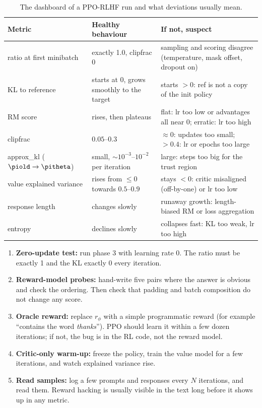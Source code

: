 \begin{table}[ht]
\centering\small
\begin{tabularx}{\linewidth}{@{}lXX@{}}
\toprule
\textbf{Metric} & \textbf{Healthy behaviour} & \textbf{If not, suspect}\\
\midrule
ratio at first minibatch & exactly 1.0, clipfrac 0 & sampling and scoring disagree (temperature, mask offset, dropout on)\\
KL to reference & starts at 0, grows smoothly to the target & starts $>0$: ref is not a copy of the init policy\\
RM score & rises, then plateaus & flat: lr too low or advantages all near 0; erratic: lr too high\\
clipfrac & $0.05$--$0.3$ & $\approx 0$: updates too small; $>0.4$: lr or epochs too large\\
approx\_kl ($\piold\to\pitheta$) & small, $\sim10^{-3}$--$10^{-2}$ per iteration & large: steps too big for the trust region\\
value explained variance & rises from $\le0$ towards $0.5$--$0.9$ & stays $<0$: critic misaligned (off-by-one) or lr too low\\
response length & changes slowly & runaway growth: length-biased RM or loss aggregation\\
entropy & declines slowly & collapses fast: KL too weak, lr too high\\
\bottomrule
\end{tabularx}
\caption{The dashboard of a PPO-RLHF run and what deviations usually mean.}
\label{tab:rlhf:dashboard}
\end{table}

\begin{deepdive}
\begin{enumerate}
  \item \textbf{Zero-update test:} run phase 3 with learning rate 0. The ratio must be exactly 1 and the KL
        exactly 0 every iteration.
  \item \textbf{Reward-model probes:} hand-write five pairs where the answer is obvious and check the
        ordering. Then check that padding and batch composition do not change any score.
  \item \textbf{Oracle reward:} replace $r_\phi$ with a simple programmatic reward (for example ``contains
        the word \emph{thanks}''). PPO should learn it within a few dozen iterations; if not, the bug
        is in the RL code, not the reward model.
  \item \textbf{Critic-only warm-up:} freeze the policy, train the value model for a few iterations, and
        watch explained variance rise.
  \item \textbf{Read samples:} log a few prompts and responses every $N$ iterations, and read them. Reward
        hacking is usually visible in the text long before it shows up in any metric.
\end{enumerate}
\end{deepdive}

